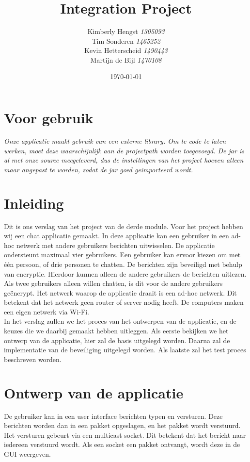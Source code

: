 \documentclass{article}
\title{Integration Project}
\author{Kimberly Hengst \emph{1305093}\\ Tim Sonderen \emph{1465252}\\ Kevin Hetterscheid \emph{1490443}\\ Martijn de Bijl \emph{1470108}}
\date{\today}
\begin{document}
\maketitle

\newpage

\section*{Voor gebruik}
\emph{Onze applicatie maakt gebruik van een externe library. Om te code te laten werken, moet deze waarschijnlijk aan de projectpath worden toegevoegd. De jar is al met onze source meegeleverd, dus de instellingen van het project hoeven alleen maar angepast te worden, zodat de jar goed geimporteerd wordt.}

\newpage

\tableofcontents

\section{Inleiding}
Dit is ons verslag van het project van de derde module. Voor het project hebben wij een chat applicatie gemaakt. In deze applicatie kan een gebruiker in een ad-hoc netwerk met andere gebruikers berichten uitwisselen. De applicatie ondersteunt maximaal vier gebruikers. Een gebruiker kan ervoor kiezen om met één persoon, of drie personen te chatten. De berichten zijn beveiligd met behulp van encryptie. Hierdoor kunnen alleen de andere gebruikers de berichten uitlezen. Als twee gebruikers alleen willen chatten, is dit voor de andere gebruikers geëncrypt. Het netwerk waarop de applicatie draait is een ad-hoc netwerk. Dit betekent dat het netwerk geen router of server nodig heeft. De computers  maken een eigen netwerk via Wi-Fi.
\\
In het verslag zullen we het proces van het ontwerpen van de applicatie, en de keuzes die we daarbij gemaakt hebben uitleggen. Als eerste bekijken we het ontwerp van de applicatie, hier zal de basis uitgelegd worden. Daarna zal de implementatie van de beveiliging uitgelegd worden. Als laatste zal het test proces beschreven worden.

\newpage

\section{Ontwerp van de applicatie}
De gebruiker kan in een user interface berichten typen en versturen. Deze berichten worden dan in een pakket opgeslagen, en het pakket wordt verstuurd. Het versturen gebeurt via een multicast socket. Dit betekent dat het bericht naar iedereen verstuurd wordt. Als een socket een pakket ontvangt, wordt deze in de GUI weergeven. 
\end{document}
